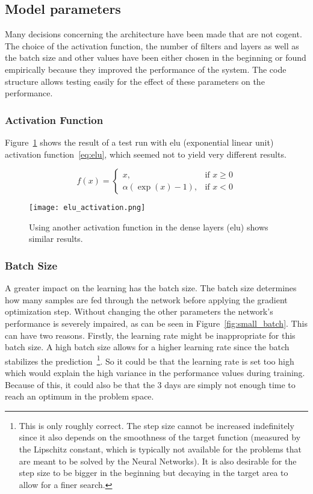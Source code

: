 \documentclass[main.tex]{subfiles}
\begin{document}
\subsection{Model parameters}
Many decisions concerning the architecture have been made that are not cogent. The choice of the activation function, the number of filters and layers as well as the batch size and other values have been either chosen in the beginning or found empirically because they improved the performance of the system. The code structure allows testing easily for the effect of these parameters on the performance. 

\subsubsection{Activation Function}

Figure~\ref{fig:other_act} shows the result of a test run with elu (exponential linear unit) activation function~\ref{eq:elu}, which seemed not to yield very different results.

\begin{equation} \label{eq:elu}
f(x)= \begin{cases}
    x,& \text{if } x\geq 0\\
    \alpha\left(\exp(x) - 1\right), & \text{if } x < 0
    \end{cases}
\end{equation}

\begin{figure}
\begin{center}
\texttt{[image: elu\_activation.png]}
\end{center}
\caption{Using another activation function in the dense layers (elu) shows similar results.}
\label{fig:other_act}
\end{figure}

\subsubsection{Batch Size}

A greater impact on the learning has the batch size. The batch size determines how many samples are fed through the network before applying the gradient optimization step. Without changing the other parameters the network's performance is severely impaired, as can be seen in Figure~\ref{fig:small_batch}. This can have two reasons. Firstly, the learning rate might be inappropriate for this batch size. A high batch size allows for a higher learning rate since the batch stabilizes the prediction~\footnote{This is only roughly correct. The step size cannot be increased indefinitely since it also depends on the smoothness of the target function (measured by the Lipschitz constant, which is typically not available for the problems that are meant to be solved by the Neural Networks). It is also desirable for the step size to be bigger in the beginning but decaying in the target area to allow for a finer search.}. So it could be that the learning rate is set too high which would explain the high variance in the performance values during training. Because of this, it could also be that the 3 days are simply not enough time to reach an optimum in the problem space.
\end{document}
